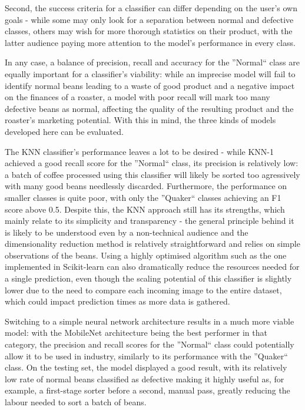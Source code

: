 Second, the success criteria for a classifier can differ depending on the user's own goals - while some may only look for
a separation between normal and defective classes, others may wish for more thorough statistics on their product, with
the latter audience paying more attention to the model's performance in every class.

In any case, a balance of precision, recall and accuracy for the ''Normal`` class are equally
important for a classifier's viability: while an imprecise model will fail to identify normal beans leading to
a waste of good product and a negative impact on the finances of a roaster, a model with poor recall will mark too many
defective beans as normal, affecting the quality of the resulting product and the roaster's marketing potential.
With this in mind, the three kinds of models developed here can be evaluated.

The KNN classifier's performance leaves a lot to be desired - while KNN-1 achieved a good recall score for the ''Normal``
class, its precision is relatively low: a batch of coffee processed using this classifier will likely be sorted too agressively
with many good beans needlessly discarded.
Furthermore, the performance on smaller classes is quite poor, with only the ''Quaker`` classes achieving an F1 score above
0.5.
Despite this, the KNN approach still has its strengths, which mainly relate to its simplicity and transparency -
the general principle behind it is likely to be understood even by a non-technical audience and the dimensionality reduction
method is relatively straightforward and relies on simple observations of the beans.
Using a highly optimised algorithm such as the one implemented in Scikit-learn can also dramatically reduce the resources
needed for a single prediction, even though the scaling potential of this classifier is slightly lower due to the need to
compare each incoming image to the entire dataset, which could impact prediction times as more data is gathered.

Switching to a simple neural network architecture results in a much more viable model: with the MobileNet architecture
being the best performer in that category, the precision and recall scores for the ''Normal`` class could potentially allow it
to be used in industry, similarly to its performance with the ''Quaker`` class.
On the testing set, the model displayed a good result, with its relatively low rate of normal beans classified as defective
making it highly useful as, for example, a first-stage sorter before a second, manual pass, greatly reducing the labour
needed to sort a batch of beans.


